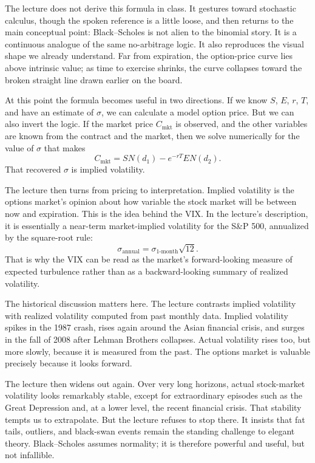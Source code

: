 The lecture does not derive this formula in class. It gestures toward stochastic calculus, though the spoken reference is a little loose, and then returns to the main conceptual point: Black--Scholes is not alien to the binomial story. It is a continuous analogue of the same no-arbitrage logic. It also reproduces the visual shape we already understand. Far from expiration, the option-price curve lies above intrinsic value; as time to exercise shrinks, the curve collapses toward the broken straight line drawn earlier on the board.

At this point the formula becomes useful in two directions. If we know $S$, $E$, $r$, $T$, and have an estimate of $\sigma$, we can calculate a model option price. But we can also invert the logic. If the market price $C_{\text{mkt}}$ is observed, and the other variables are known from the contract and the market, then we solve numerically for the value of $\sigma$ that makes
\begin{equation}
C_{\text{mkt}}=SN(d_1)-e^{-rT}EN(d_2).
\end{equation}
That recovered $\sigma$ is implied volatility.

The lecture then turns from pricing to interpretation. Implied volatility is the options market's opinion about how variable the stock market will be between now and expiration. This is the idea behind the VIX. In the lecture's description, it is essentially a near-term market-implied volatility for the S\&P 500, annualized by the square-root rule:
\begin{equation}
\sigma_{\text{annual}}=\sigma_{\text{1-month}}\sqrt{12}.
\end{equation}
That is why the VIX can be read as the market's forward-looking measure of expected turbulence rather than as a backward-looking summary of realized volatility.

The historical discussion matters here. The lecture contrasts implied volatility with realized volatility computed from past monthly data. Implied volatility spikes in the 1987 crash, rises again around the Asian financial crisis, and surges in the fall of 2008 after Lehman Brothers collapses. Actual volatility rises too, but more slowly, because it is measured from the past. The options market is valuable precisely because it looks forward.

The lecture then widens out again. Over very long horizons, actual stock-market volatility looks remarkably stable, except for extraordinary episodes such as the Great Depression and, at a lower level, the recent financial crisis. That stability tempts us to extrapolate. But the lecture refuses to stop there. It insists that fat tails, outliers, and black-swan events remain the standing challenge to elegant theory. Black--Scholes assumes normality; it is therefore powerful and useful, but not infallible.

